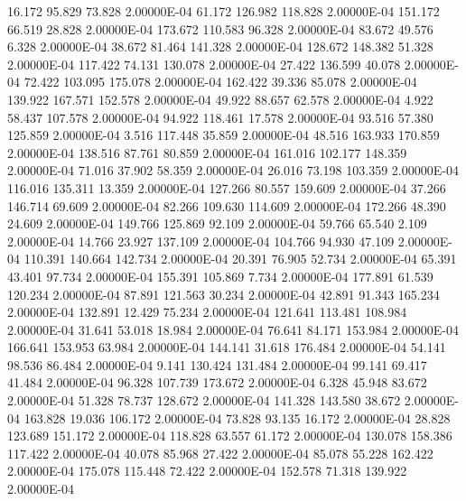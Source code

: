    16.172    95.829    73.828  2.00000E-04
    61.172   126.982   118.828  2.00000E-04
   151.172    66.519    28.828  2.00000E-04
   173.672   110.583    96.328  2.00000E-04
    83.672    49.576     6.328  2.00000E-04
    38.672    81.464   141.328  2.00000E-04
   128.672   148.382    51.328  2.00000E-04
   117.422    74.131   130.078  2.00000E-04
    27.422   136.599    40.078  2.00000E-04
    72.422   103.095   175.078  2.00000E-04
   162.422    39.336    85.078  2.00000E-04
   139.922   167.571   152.578  2.00000E-04
    49.922    88.657    62.578  2.00000E-04
     4.922    58.437   107.578  2.00000E-04
    94.922   118.461    17.578  2.00000E-04
    93.516    57.380   125.859  2.00000E-04
     3.516   117.448    35.859  2.00000E-04
    48.516   163.933   170.859  2.00000E-04
   138.516    87.761    80.859  2.00000E-04
   161.016   102.177   148.359  2.00000E-04
    71.016    37.902    58.359  2.00000E-04
    26.016    73.198   103.359  2.00000E-04
   116.016   135.311    13.359  2.00000E-04
   127.266    80.557   159.609  2.00000E-04
    37.266   146.714    69.609  2.00000E-04
    82.266   109.630   114.609  2.00000E-04
   172.266    48.390    24.609  2.00000E-04
   149.766   125.869    92.109  2.00000E-04
    59.766    65.540     2.109  2.00000E-04
    14.766    23.927   137.109  2.00000E-04
   104.766    94.930    47.109  2.00000E-04
   110.391   140.664   142.734  2.00000E-04
    20.391    76.905    52.734  2.00000E-04
    65.391    43.401    97.734  2.00000E-04
   155.391   105.869     7.734  2.00000E-04
   177.891    61.539   120.234  2.00000E-04
    87.891   121.563    30.234  2.00000E-04
    42.891    91.343   165.234  2.00000E-04
   132.891    12.429    75.234  2.00000E-04
   121.641   113.481   108.984  2.00000E-04
    31.641    53.018    18.984  2.00000E-04
    76.641    84.171   153.984  2.00000E-04
   166.641   153.953    63.984  2.00000E-04
   144.141    31.618   176.484  2.00000E-04
    54.141    98.536    86.484  2.00000E-04
     9.141   130.424   131.484  2.00000E-04
    99.141    69.417    41.484  2.00000E-04
    96.328   107.739   173.672  2.00000E-04
     6.328    45.948    83.672  2.00000E-04
    51.328    78.737   128.672  2.00000E-04
   141.328   143.580    38.672  2.00000E-04
   163.828    19.036   106.172  2.00000E-04
    73.828    93.135    16.172  2.00000E-04
    28.828   123.689   151.172  2.00000E-04
   118.828    63.557    61.172  2.00000E-04
   130.078   158.386   117.422  2.00000E-04
    40.078    85.968    27.422  2.00000E-04
    85.078    55.228   162.422  2.00000E-04
   175.078   115.448    72.422  2.00000E-04
   152.578    71.318   139.922  2.00000E-04
